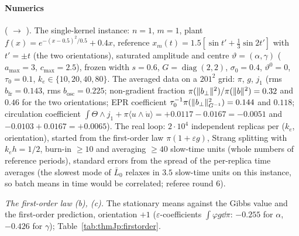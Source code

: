 \paragraph{Numerics} ( $\to$ ). The single-kernel
instance: $n = 1$, $m = 1$, plant $f(x) = e^{-(x-0.5)^2/0.5} + 0.4x$, reference
$x_m(t) = 1.5[\sin t' + \tfrac{1}{3}\sin2t']$ with $t' = \pm t$ (the two orientations), saturated amplitude and
centre $\vartheta = (\alpha,\gamma)$ ($a_{\max} = 3$, $c_{\max} = 2.5$), frozen width $s = 0.6$,
$G = \operatorname{diag}(2,2)$, $\sigma_0 = 0.4$, $\vartheta^0 = 0$, $\tau_0 = 0.1$, $k_e\in\{10,20,40,80\}$. The
averaged data on a $201^2$ grid: $\pi$, $g$, $j_1$ (rms $b_{\mathrm{fr}} = 0.143$, rms $b_{\mathrm{osc}} = 0.225$;
non-gradient fraction $\pi(\lVert b_\perp\rVert^2)/\pi(\lVert b\rVert^2) = 0.32$ and $0.46$ for the two orientations; EPR
coefficient $\tau_0^{-1}\pi(\lVert b_\perp\rVert^2_{G^{-1}}) = 0.144$ and $0.118$; circulation coefficient
$\int\Theta\wedge j_1 + \pi\langle u\wedge\dot u\rangle = +0.0117 - 0.0167 = -0.0051$ and
$-0.0103 + 0.0167 = +0.0065$). The real loop: $2\cdot10^4$ independent replicas per ($k_e$, orientation), started
from the first-order law $\pi(1 + \varepsilon g)$, Strang splitting with $k_eh = 1/2$, burn-in $\ge10$ and averaging
$\ge40$ slow-time units (whole numbers of reference periods), standard errors from the spread of the per-replica time
averages (the slowest mode of $\bar L_0$ relaxes in $3.5$ slow-time units on this instance, so batch means in time
would be correlated; referee round 6).

\smallskip
\noindent\emph{The first-order law (b), (c).} The stationary means against the Gibbs value and the first-order
prediction, orientation $+1$ ($\varepsilon$-coefficients $\int\varphi g\dd\pi$: $-0.255$ for $\alpha$, $-0.426$ for
$\gamma$); Table~\ref{tab:thmJp:firstorder}.

